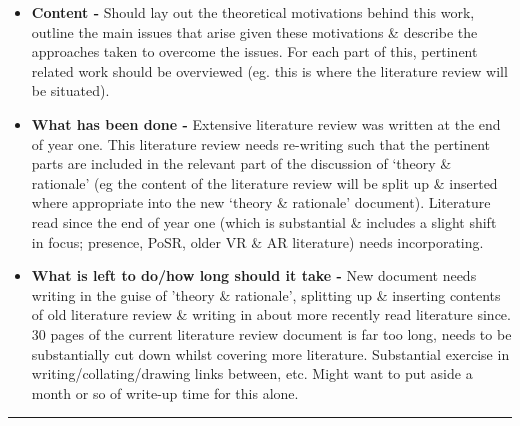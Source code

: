 \begin{itemize}
	\item \textbf{Content -} Should lay out the theoretical motivations behind this work, outline the main issues that arise given these motivations \& describe the approaches taken to overcome the issues. For each part of this, pertinent related work should be overviewed (eg. this is where the literature review will be situated).
	\item \textbf{What has been done -} Extensive literature review was written at the end of year one. This literature review needs re-writing such that the pertinent parts are included in the relevant part of the discussion of `theory \& rationale' (eg the content of the literature review will be split up \& inserted where appropriate into the new `theory \& rationale' document). Literature read since the end of year one (which is substantial \& includes a slight shift in focus; presence, PoSR, older VR \& AR literature) needs incorporating.
	\item \textbf{What is left to do/how long should it take -} New document needs writing in the guise of 'theory \& rationale', splitting up \& inserting contents of old literature review \& writing in about more recently read literature since. 30 pages of the current literature review document is far too long, needs to be substantially cut down whilst covering more literature. Substantial exercise in writing/collating/drawing links between, etc. Might want to put aside a month or so of write-up time for this alone.
\end{itemize}

\hrule